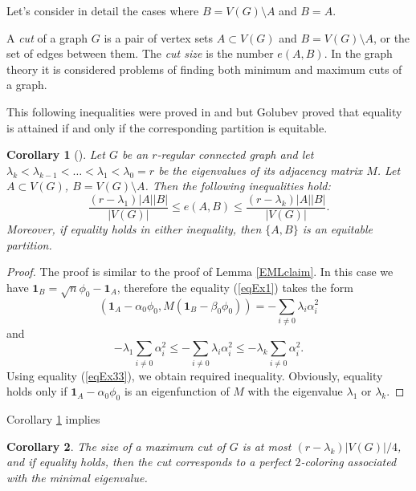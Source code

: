 \documentclass[11pt]{article}
\newtheorem{corollary}{Corollary}[section]
\theoremstyle{definition}
\begin{document}
Let's consider in detail the cases where $B=V(G)\setminus A$ and $B=A$.

A {\sl cut} of a graph $G$ is a pair of vertex sets $A\subset
V(G)$ and $B=V(G)\setminus A$, or the set of edges between them.
The {\sl cut size} is the number $e(A,B)$. 
In the graph theory it is 
considered problems of finding both minimum and maximum
cuts of a graph.

This following inequalities were proved in 
\cite{AlonM} and  \cite{Tanner} but Golubev \cite{Golubev} proved
that equality is attained if and only if the corresponding partition is equitable. 

\begin{corollary}[\cite{Golubev}]\label{cut}
Let $G$ be an $r$-regular connected graph and let
$\lambda_k<\lambda_{k-1}<\dots<\lambda_{1}<\lambda_0=r$
be the eigenvalues of its adjacency matrix $M$. Let $A\subset
V(G)$, $B=V(G)\setminus A$. Then the following inequalities hold:
$$ \frac{(r-\lambda_1)|A||B|}{|V(G)|}\leq e(A,B)\leq \frac{(r-\lambda_k)|A||B|}{|V(G)|}.$$
Moreover, if  equality holds in either  inequality, then $\{A, B\}$ is an equitable partition.
\end{corollary}
\begin{proof}
The proof is similar to the proof of Lemma \ref{EMLclaim}. In this
case we have ${\mathbf 1}_{B}=\sqrt{n}\phi_0-{\mathbf 1}_{A}$, therefore the equality
(\ref{eqEx1}) takes the form
$$({\mathbf 1}_{A}-\alpha_0\phi_0, M({\mathbf 1}_{B}-\beta_0\phi_0))=
-\sum\limits_{i\neq 0}\lambda_i\alpha_i^2$$ and
$$-\lambda_1\sum\limits_{i\neq 0}\alpha_i^2\leq -\sum\limits_{i\neq
0}\lambda_i\alpha_i^2\leq -\lambda_k\sum\limits_{i\neq
0}\alpha_i^2.$$ Using  equality (\ref{eqEx33}), we obtain
required inequality. Obviously, equality holds 
only if ${\mathbf 1}_{A}-\alpha_0\phi_0$ is an
eigenfunction of  $M$ with the eigenvalue $\lambda_1$
or $\lambda_k$.
\end{proof}

Corollary \ref{cut} implies

\begin{corollary}
The size of a maximum cut of  $G$ is at most
$(r-\lambda_k)|V(G)|/4$, and if equality holds, then the cut corresponds to a
perfect $2$-coloring associated with the minimal eigenvalue.
\end{corollary}
\end{document}
